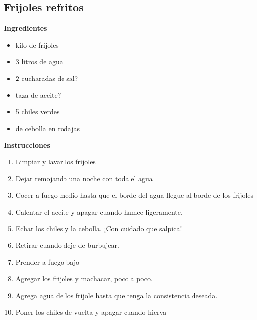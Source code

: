 \subsection{Frijoles refritos}
\textbf{Ingredientes}
\begin{itemize}
\item {} kilo de frijoles
\item 3 litros de agua
\item 2 cucharadas de sal?
\item {} taza de aceite?
\item 5 chiles verdes
\item {} de cebolla en rodajas
\end{itemize}

\textbf{Instrucciones}
\begin{enumerate}
\item Limpiar y lavar los frijoles
\item Dejar remojando una noche con toda el agua
\item Cocer a fuego medio hasta que el borde del agua llegue al borde de los frijoles
\item Calentar el aceite y apagar cuando humee ligeramente.
\item Echar los chiles y la cebolla. ¡Con cuidado que salpica!
\item Retirar cuando deje de burbujear.
\item Prender a fuego bajo
\item Agregar los frijoles y machacar, poco a poco.
\item Agrega agua de los frijole hasta que tenga la consistencia deseada.
\item Poner los chiles de vuelta y apagar cuando hierva  
\end{enumerate}
